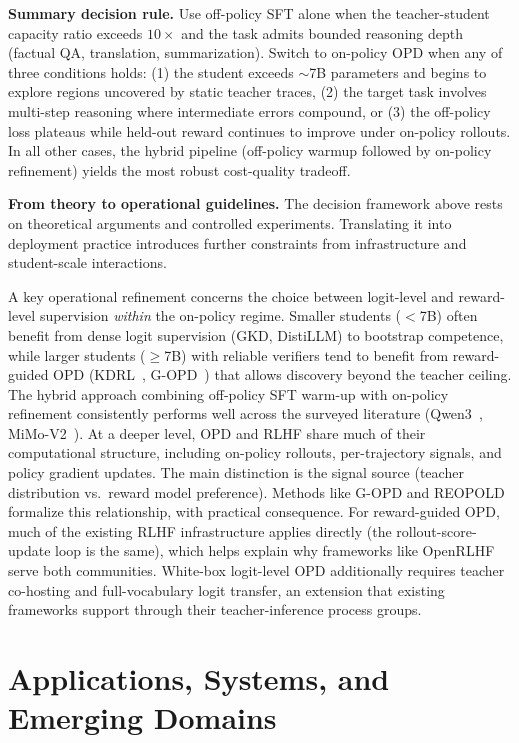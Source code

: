 \documentclass{article} %
\begin{document}
\textbf{Summary decision rule.} Use off-policy SFT alone when the teacher-student capacity ratio exceeds $10{\times}$ and the task admits bounded reasoning depth (factual QA, translation, summarization). Switch to on-policy OPD when any of three conditions holds: (1) the student exceeds $\sim$7B parameters and begins to explore regions uncovered by static teacher traces, (2) the target task involves multi-step reasoning where intermediate errors compound, or (3) the off-policy loss plateaus while held-out reward continues to improve under on-policy rollouts. In all other cases, the hybrid pipeline (off-policy warmup followed by on-policy refinement) yields the most robust cost-quality tradeoff.

\textbf{From theory to operational guidelines.} The decision framework above rests on theoretical arguments and controlled experiments. Translating it into deployment practice introduces further constraints from infrastructure and student-scale interactions.

A key operational refinement concerns the choice between logit-level and reward-level supervision \emph{within} the on-policy regime. Smaller students ($<$7B) often benefit from dense logit supervision (GKD, DistiLLM) to bootstrap competence, while larger students ($\ge$7B) with reliable verifiers tend to benefit from reward-guided OPD (KDRL~\citep{2506.02208}, G-OPD~\citep{2602.12125}) that allows discovery beyond the teacher ceiling. The hybrid approach combining off-policy SFT warm-up with on-policy refinement consistently performs well across the surveyed literature (Qwen3~\citep{2505.09388}, MiMo-V2~\citep{2601.02780}). At a deeper level, OPD and RLHF share much of their computational structure, including on-policy rollouts, per-trajectory signals, and policy gradient updates. The main distinction is the signal source (teacher distribution vs.\ reward model preference). Methods like G-OPD and REOPOLD~\citep{2603.11137} formalize this relationship, with practical consequence. For reward-guided OPD, much of the existing RLHF infrastructure applies directly (the rollout-score-update loop is the same), which helps explain why frameworks like OpenRLHF~\citep{hu2024openrlhf} serve both communities. White-box logit-level OPD additionally requires teacher co-hosting and full-vocabulary logit transfer, an extension that existing frameworks support through their teacher-inference process groups.



\section{Applications, Systems, and Emerging Domains}
\label{sec:applications}
\end{document}

